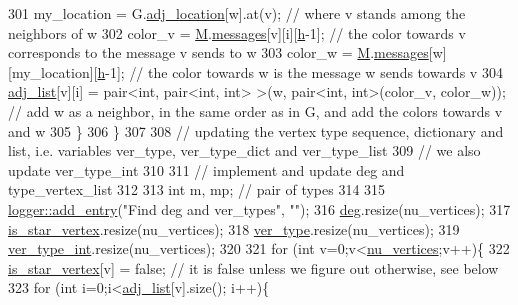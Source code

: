 \begin{DoxyCode}
301       my\_location = G.\hyperlink{classmarked__graph_a3ae722ea9583ad23af34d789a88ac01a}{adj\_location}[w].at(v); \textcolor{comment}{// where v stands among the neighbors of w}
302       color\_v = \hyperlink{classcolored__graph_ab72c568fe12f7c849ca6bffb145aec47}{M}.\hyperlink{classgraph__message_aac77e098f0acf9650116a8e51fe3b4b7}{messages}[v][i][\hyperlink{classcolored__graph_ae27062a4ee59df2670d3a0c81e85a3fa}{h}-1]; \textcolor{comment}{// the color towards v corresponds to the message v sends
       to w}
303       color\_w = \hyperlink{classcolored__graph_ab72c568fe12f7c849ca6bffb145aec47}{M}.\hyperlink{classgraph__message_aac77e098f0acf9650116a8e51fe3b4b7}{messages}[w][my\_location][\hyperlink{classcolored__graph_ae27062a4ee59df2670d3a0c81e85a3fa}{h}-1]; \textcolor{comment}{// the color towards w is the message w sends
       towards v}
304       \hyperlink{classcolored__graph_a45dce16965079286cf3f41a54a1b2ea4}{adj\_list}[v][i] = pair<int, pair<int, int> >(w, pair<int, int>(color\_v, color\_w)); \textcolor{comment}{// add w as
       a neighbor, in the same order as in G, and add the colors towards v and w }
305     \}
306   \}
307 
308   \textcolor{comment}{// updating the vertex type sequence, dictionary and list, i.e. variables ver\_type, ver\_type\_dict and
       ver\_type\_list}
309   \textcolor{comment}{// we also update ver\_type\_int}
310 
311   \textcolor{comment}{// implement and update deg and type\_vertex\_list}
312   
313   \textcolor{keywordtype}{int} m, mp; \textcolor{comment}{// pair of types}
314 
315   \hyperlink{classlogger_a710163deb17bc81f70d53d285b8ac9ac}{logger::add\_entry}(\textcolor{stringliteral}{"Find deg and ver\_types"}, \textcolor{stringliteral}{""});
316   \hyperlink{classcolored__graph_ae3269d35c1b022bc70d195bebd4e1b8a}{deg}.resize(nu\_vertices);
317   \hyperlink{classcolored__graph_ad41163e970530c7e45878d299f0dc961}{is\_star\_vertex}.resize(nu\_vertices);
318   \hyperlink{classcolored__graph_a2cc32e7146fa3319f83cfa940f5e1be4}{ver\_type}.resize(nu\_vertices);
319   \hyperlink{classcolored__graph_a491ed2ea1a65118af02ec606c8d44c0a}{ver\_type\_int}.resize(nu\_vertices);
320 
321   \textcolor{keywordflow}{for} (\textcolor{keywordtype}{int} v=0;v<\hyperlink{classcolored__graph_a90ece8eb1fec52f3f41549ab527c1d5b}{nu\_vertices};v++)\{
322     \hyperlink{classcolored__graph_ad41163e970530c7e45878d299f0dc961}{is\_star\_vertex}[v] = \textcolor{keyword}{false}; \textcolor{comment}{// it is false unless we figure out otherwise, see below}
323     \textcolor{keywordflow}{for} (\textcolor{keywordtype}{int} i=0;i<\hyperlink{classcolored__graph_a45dce16965079286cf3f41a54a1b2ea4}{adj\_list}[v].size(); i++)\{

\end{DoxyCode}
